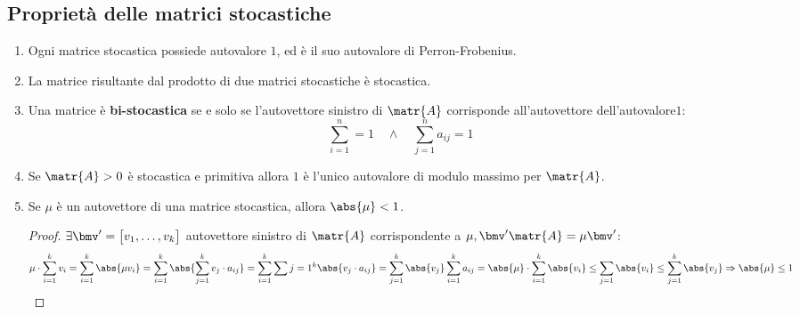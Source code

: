\documentclass[\main/main.tex]{subfiles}
\begin{document}
\subsection{Proprietà delle matrici stocastiche}
\begin{enumerate}
  \item Ogni matrice stocastica possiede autovalore \(1\), ed è il suo autovalore di
        Perron-Frobenius.
  \item La matrice risultante dal prodotto di due matrici stocastiche è stocastica.
  \item Una matrice è \textbf{bi-stocastica} se e solo se l'autovettore sinistro di \(\matr{A}\) corrisponde all'autovettore dell'autovalore\(1\):
        \[
          \sum_{i=1}^n = 1 \quad \land \quad \sum_{j=1}^n a_{ij} = 1
        \]
  \item Se \(\matr{A} > 0\) è stocastica e primitiva allora \(1\) è l'unico autovalore di modulo massimo per \(\matr{A}\).
  \item Se \(\mu \) è un autovettore di una matrice stocastica, allora \(\abs{\mu} < 1\).
        \begin{proof}
          \(\exists \bmv' = \begin{bmatrix}
            v_1, \ldots, v_k
          \end{bmatrix}\) autovettore sinistro di \(\matr{A}\) corrispondente a \(\mu, \bmv' \matr{A} = \mu \bmv'\):
          \[
            \mu \cdot \sum_{i=1}^k v_i = \sum_{i=1}^k \abs{\mu v_i} = \sum_{i=1}^k \abs{\sum_{j=1}^k v_j\cdot a_{ij}} = \sum_{i=1}^k \sum{j=1}^k \abs{v_j \cdot a_{ij}} = \sum_{j=1}^k \abs{v_j} \sum_{i=1}^k a_{ij} = \abs{\mu} \cdot \sum_{i=1}^k \abs{v_i} \leq \sum_{j=1} \abs{v_i} \leq \sum_{j=1}^k \abs{v_j} \Rightarrow \abs{\mu} \leq 1
          \]
        \end{proof}
\end{enumerate}
\end{document}
